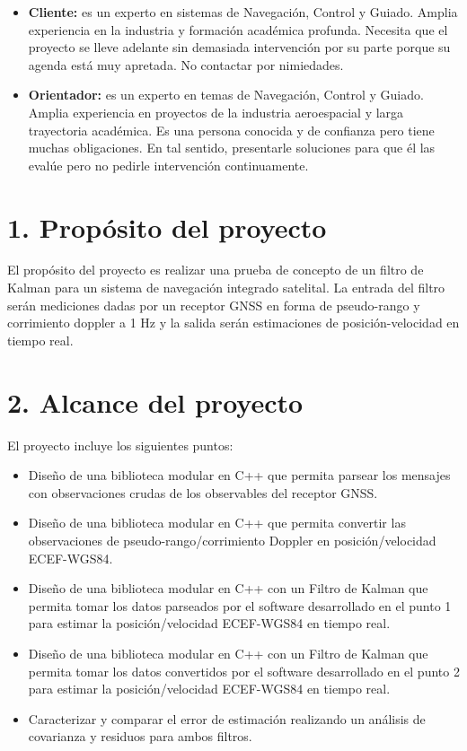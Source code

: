 \documentclass[11pt]{charter}
\begin{document}
\begin{itemize}
\item \textbf{Cliente:} es un experto en sistemas de Navegación, Control y Guiado. Amplia experiencia en la industria y formación académica profunda. Necesita que el proyecto se lleve adelante sin demasiada intervención por su parte porque su agenda está muy apretada. No contactar por nimiedades.
\item \textbf{Orientador:} es un experto en temas de Navegación, Control y Guiado. Amplia experiencia en proyectos de la industria aeroespacial y larga trayectoria académica. Es una persona conocida y de confianza pero tiene muchas obligaciones. En tal sentido, presentarle soluciones para que él las evalúe pero no pedirle intervención continuamente.
\end{itemize}


\section{1. Propósito del proyecto}
\label{sec:proposito}

El propósito del proyecto es realizar una prueba de concepto de un filtro de Kalman para un sistema de navegación integrado satelital. La entrada del filtro serán mediciones dadas por un receptor GNSS en forma de pseudo-rango y corrimiento doppler a 1 Hz y la salida serán estimaciones de posición-velocidad en tiempo real.

\section{2. Alcance del proyecto}
\label{sec:alcance}

El proyecto incluye los siguientes puntos: 

\begin{itemize}
\item Diseño de una biblioteca modular en C++ que permita parsear los mensajes con observaciones crudas de los observables del receptor GNSS.
\item Diseño de una biblioteca modular en C++ que permita convertir las observaciones de pseudo-rango/corrimiento Doppler en posición/velocidad ECEF-WGS84.
\item Diseño de una biblioteca modular en C++ con un Filtro de Kalman que permita tomar los datos parseados por el software desarrollado en el punto 1 para estimar la posición/velocidad ECEF-WGS84 en tiempo real.
\item Diseño de una biblioteca modular en C++ con un Filtro de Kalman que permita tomar los datos convertidos por el software desarrollado en el punto 2 para estimar la posición/velocidad ECEF-WGS84 en tiempo real.
\item Caracterizar y comparar el error de estimación realizando un análisis de covarianza y residuos para ambos filtros.
\end{itemize}
\end{document}
